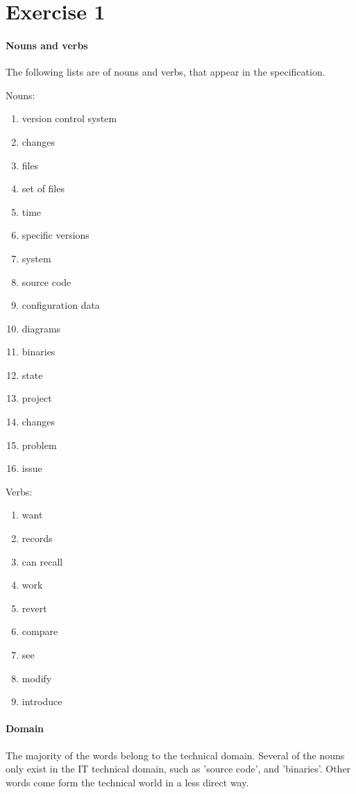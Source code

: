 \section{Exercise 1}
\paragraph{Nouns and verbs}
The following lists are of nouns and verbs, that appear in the specification.

Nouns:
\begin{enumerate}
	\item version control system
	\item changes
	\item files
	\item set of files
	\item time
	\item specific versions
	\item system
	\item source code
	\item configuration data
	\item diagrams
	\item binaries
	\item state
	\item project
	\item changes
	\item problem
	\item issue
\end{enumerate}

Verbs:
\begin{enumerate}
	\item want
	\item records 
	\item can recall
	\item work
	\item revert
	\item compare
	\item see
	\item modify
	\item introduce
\end{enumerate}

\paragraph{Domain}
The majority of the words belong to the technical domain.
Several of the nouns only exist in the IT technical domain, such as 'source code', and 'binaries'.
Other words come form the technical world in a less direct way.

